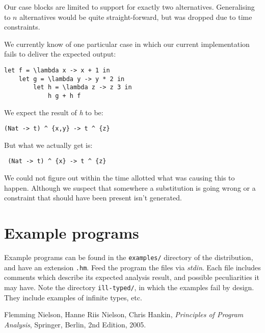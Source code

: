 \documentclass[a4paper]{article}
\begin{document}
Our case blocks are limited to support for exactly two alternatives.
Generalising to $n$ alternatives would be quite straight-forward, but was dropped
due to time constraints.

We currently know of one particular case in which our current implementation fails to
deliver the expected output:

\begin{verbatim}
let f = \lambda x -> x + 1 in 
    let g = \lambda y -> y * 2 in 
        let h = \lambda z -> z 3 in 
            h g + h f
\end{verbatim}

We expect the result of \emph{h} to be:

\begin{verbatim}
(Nat -> t) ^ {x,y} -> t ^ {z}
\end{verbatim}

But what we actually get is:

\begin{verbatim}
 (Nat -> t) ^ {x} -> t ^ {z}
\end{verbatim}

We could not figure out within the time allotted what was causing this to happen. Although
we suspect that somewhere a substitution is going wrong or a constraint that should have been
present isn't generated.


\section{Example programs}

Example programs can be found in the \texttt{examples/} directory of the distribution, 
and have an extension \texttt{.hm}. Feed the program the files via \emph{stdin}. Each file
includes comments which describe its expected analysis result, and possible peculiarities
it may have. Note the directory \texttt{ill-typed/}, in which the examples fail by design.
They include examples of infinite types, etc. 


\begin{thebibliography}{9}

  {Flemming Nielson, Hanne Riis Nielson, Chris Hankin},
  \emph{Principles of Program Analysis},
  Springer, Berlin,
  2nd Edition,
  2005.

\end{thebibliography}
\end{document}
